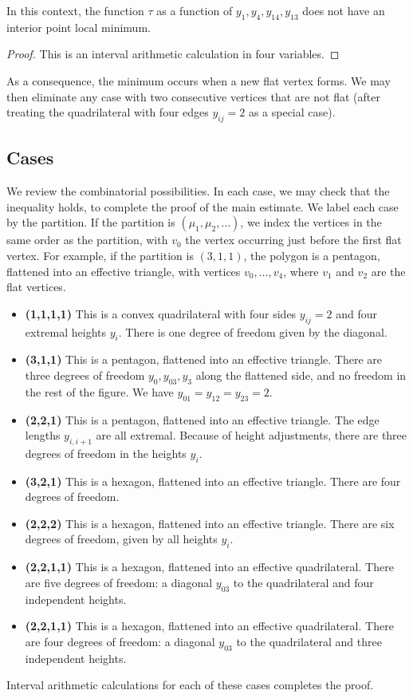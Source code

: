 \begin{lemma}
In this context, the function $\tau$ as a function of $y_1,y_4,y_{14},y_{13}$ does not have an interior point local minimum.
\end{lemma}

\begin{proof} This is an interval arithmetic calculation in four variables.
\end{proof}

As a consequence, the minimum occurs when a new flat vertex forms.  We may then eliminate any case with two consecutive vertices that are not flat (after treating the quadrilateral with four edges $y_{ij}=2$ as a special case).

\subsection{Cases}

We review the combinatorial possibilities.  In each case, we may check that the inequality holds, to complete the proof of the main estimate.  We label each 
case by the partition.  If the partition is $(\mu_1,\mu_2,\ldots)$, we
index the vertices in the same order as the partition, with $v_0$
the vertex occurring just before the first flat vertex.  For example,
if the partition is $(3,1,1)$, the polygon is a pentagon, flattened into
an effective triangle, with vertices $v_0,\ldots,v_4$, where $v_1$ and $v_2$
are the flat vertices.

\begin{itemize}
\item {\bf (1,1,1,1)}  This is a convex quadrilateral with four sides $y_{ij}=2$ and four extremal heights $y_i$.  There is one degree of freedom given by the diagonal.
\item {\bf (3,1,1)}  This is a pentagon, flattened into an effective triangle.  There are three degrees of freedom $y_0,y_{03},y_3$ along the flattened side, and no freedom in the rest of the figure.  We have $y_{01}=y_{12}=y_{23}=2$.
\item {\bf (2,2,1)} This is a pentagon, flattened into an effective triangle.  The edge lengths $y_{i,i+1}$ are all extremal.  Because of height adjustments, there are three degrees of freedom in the heights $y_i$.
\item {\bf (3,2,1)} This is a hexagon, flattened into an effective triangle.  There are four degrees of freedom.
\item {\bf (2,2,2)}  This is a hexagon, flattened into an effective triangle.  There are six degrees of freedom, given by all heights $y_i$.
\item {\bf (2,2,1,1)} This is a hexagon, flattened into an effective quadrilateral.  There are five degrees of freedom: a diagonal $y_{03}$ to the quadrilateral and four independent heights.
\item {\bf (2,2,1,1)}  This is a hexagon, flattened into an effective quadrilateral.  There are four degrees of freedom: a diagonal $y_{03}$ to the quadrilateral and three independent heights.
\end{itemize}


Interval arithmetic calculations for each of these cases completes the proof.


